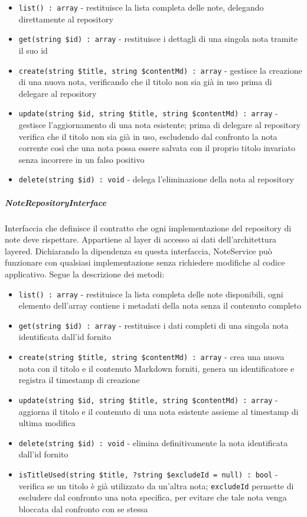 \documentclass[a4paper,10pt]{article}
\begin{document}
\begin{itemize}
    \item \texttt{list() : array} - restituisce la lista completa delle note, delegando direttamente al repository
    \item \texttt{get(string \$id) : array} - restituisce i dettagli di una singola nota tramite il suo id
    \item \texttt{create(string \$title, string \$contentMd) : array} - gestisce la creazione di una nuova nota, verificando che il titolo non sia già in uso prima di delegare al repository 
    \item \texttt{update(string \$id, string \$title, string \$contentMd) : array} - gestisce l'aggiornamento di una nota esistente; prima di delegare al repository verifica che il titolo non sia già in uso, escludendo dal confronto la nota corrente così che una nota possa essere salvata con il proprio titolo invariato senza incorrere in un falso positivo
    \item \texttt{delete(string \$id) : void} - delega l'eliminazione della nota al repository
\end{itemize}
\subparagraph{NoteRepositoryInterface} Interfaccia che definisce il contratto che ogni implementazione del repository di note deve rispettare. Appartiene al layer di accesso ai dati dell'architettura layered. Dichiarando la dipendenza su questa interfaccia, NoteService può funzionare con qualsiasi implementazione senza richiedere modifiche al codice applicativo. Segue la descrizione dei metodi: 
\begin{itemize}
    \item \texttt{list() : array} - restituisce la lista completa delle note disponibili, ogni elemento dell'array contiene i metadati della nota senza il contenuto completo
    \item \texttt{get(string \$id) : array} - restituisce i dati completi di una singola nota identificata dall'id fornito
    \item \texttt{create(string \$title, string \$contentMd) : array} - crea una nuova nota con il titolo e il contenuto Markdown forniti, genera un identificatore e registra il timestamp di creazione
    \item \texttt{update(string \$id, string \$title, string \$contentMd) : array} - aggiorna il titolo e il contenuto di una nota esistente assieme al timestamp di ultima modifica
    \item \texttt{delete(string \$id) : void} - elimina definitivamente la nota identificata dall'id fornito
    \item \texttt{isTitleUsed(string \$title, ?string \$excludeId = null) : bool} - verifica se un titolo è già utilizzato da un'altra nota; \texttt{excludeId} permette di escludere dal confronto una nota specifica, per evitare che tale nota venga bloccata dal confronto con se stessa
\end{itemize}
\end{document}
